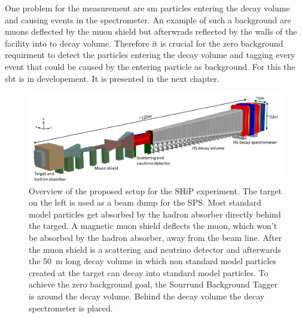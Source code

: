 One problem for the measurement are \ac{sm} particles entering the decay volume and causing events in the spectrometer.
An example of such a background are muons deflected by the muon shield but afterwrads reflected by the walls of the facility into to decay volume.
Therefore it is crucial for the zero background requirment to detect the particles entering the decay volume and tagging every event that could be caused by the entering particle as background.
For this the \ac{sbt} is in developement.
It is presented in the next chapter.



\begin{figure}
	\centering
	\includegraphics[width=1.\textwidth]{pictures/ship_sketch}
	\caption[Overview of the SHiP experiment.]{Overview of the proposed setup for the SHiP experiment. The target on the left is used as a beam dump for the SPS. Most standard model particles get absorbed by the hadron absorber directly behind the targed. A magnetic muon shield deflects the muon, which won't be absorbed by the hadron absorber, away from the beam line. After the muon shield is a scattering and neutrino detector and afterwards the \SI{50}{\meter} long decay volume in which non standard model particles created at the target can decay into standard model particles. To achieve the zero background goal, the Sourrund Background Tagger is around the decay volume. Behind the decay volume the decay spectrometer is placed. \cite{ship_coll}}
	\label{fig:ship_sketch}
\end{figure}
